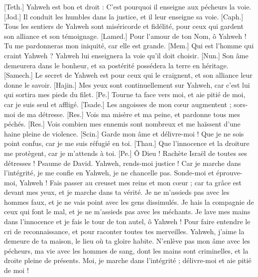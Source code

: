 \begin{multicols}{2}
[Teth.] Yahweh est bon et droit : C'est pourquoi il enseigne aux pécheurs la voie.
[Jod.] Il conduit les humbles dans la justice, et il leur enseigne sa voie.
[Caph.] Tous les sentiers de Yahweh sont miséricorde et fidélité, pour ceux qui gardent son alliance et son témoignage.
[Lamed.] Pour l'amour de ton Nom, ô Yahweh ! Tu me pardonneras mon iniquité, car elle est grande.
[Mem.] Qui est l'homme qui craint Yahweh ? Yahweh lui enseignera la voie qu'il doit choisir.
[Nun.] Son âme demeurera dans le bonheur, et sa postérité possédera la terre en héritage.
[Samech.] Le secret de Yahweh est pour ceux qui le craignent, et son alliance leur donne le savoir.
[Hajin.] Mes yeux sont continuellement sur Yahweh, car c'est lui qui sortira mes pieds du filet.
[Pe.] Tourne ta face vers moi, et aie pitié de moi, car je suis seul et affligé.
[Tsade.] Les angoisses de mon cœur augmentent ; sors-moi de ma détresse.
[Res.] Vois ma misère et ma peine, et pardonne tous mes péchés.
[Res.] Vois combien mes ennemis sont nombreux et me haïssent d'une haine pleine de violence.
[Scin.] Garde mon âme et délivre-moi ! Que je ne sois point confus, car je me suis réfugié en toi.
[Thau.] Que l'innocence et la droiture me protègent, car je m’attends à toi.
[Pe.] Ô Dieu ! Rachète Israël de toutes ses détresses !
\VerseOne{}Psaume de David. Yahweh, rends-moi justice ! Car je marche dans l’intégrité, je me confie en Yahweh, je ne chancelle pas.
Sonde-moi et éprouve-moi, Yahweh ! Fais passer au creuset mes reins et mon cœur ;
car ta grâce est devant mes yeux, et je marche dans ta vérité.
Je ne m’assieds pas avec les hommes faux, et je ne vais point avec les gens dissimulés.
Je hais la compagnie de ceux qui font le mal, et je ne m’assieds pas avec les méchants.
Je lave mes mains dans l'innocence et je fais le tour de ton autel, ô Yahweh !
Pour faire entendre le cri de reconnaissance, et pour raconter toutes tes merveilles.
Yahweh, j'aime la demeure de ta maison, le lieu où ta gloire habite.
N'enlève pas mon âme avec les pécheurs, ma vie avec les hommes de sang,
dont les mains sont criminelles, et la droite pleine de présents.
Moi, je marche dans l’intégrité ; délivre-moi et aie pitié de moi !

\end{multicols}
